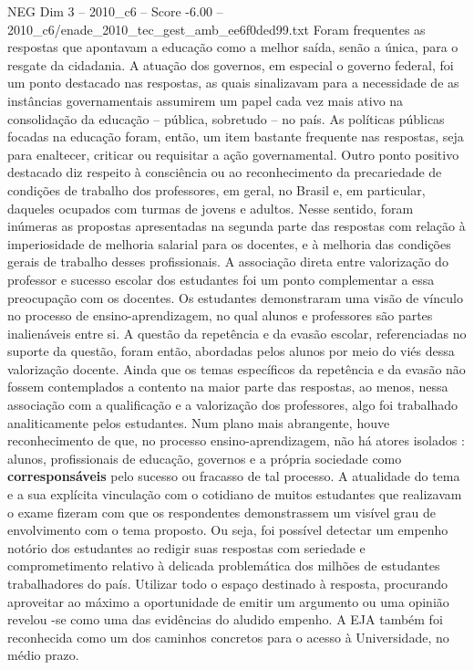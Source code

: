 \begin{textsample}{NEG Dim 3 – 2010\_c6 – Score -6.00 – 2010\_c6/enade\_2010\_tec\_gest\_amb\_ee6f0ded99.txt}
Foram frequentes as respostas que apontavam a educação como a melhor saída, senão a única, para o resgate da cidadania.
A atuação dos governos, em especial o governo federal, foi um ponto destacado nas respostas, as quais sinalizavam para a necessidade de as instâncias governamentais assumirem um papel cada vez mais ativo na consolidação da educação – pública, sobretudo – no país.
As políticas públicas focadas na educação foram, então, um item bastante frequente nas respostas, seja para enaltecer, criticar ou requisitar a ação governamental.
Outro ponto positivo destacado diz respeito à consciência ou ao reconhecimento da precariedade de condições de trabalho dos professores, em geral, no Brasil e, em particular, daqueles ocupados com turmas de jovens e adultos.
Nesse sentido, foram inúmeras as propostas apresentadas na segunda parte das respostas com relação à imperiosidade de melhoria salarial para os docentes, e à melhoria das condições gerais de trabalho desses profissionais.
A associação direta entre valorização do professor e sucesso escolar dos estudantes foi um ponto complementar a essa preocupação com os docentes.
Os estudantes demonstraram uma visão de vínculo no processo de ensino-aprendizagem, no qual alunos e professores são partes inalienáveis entre si.
A questão da repetência e da evasão escolar, referenciadas no suporte da questão, foram então, abordadas pelos alunos por meio do viés dessa valorização docente.
Ainda que os temas específicos da repetência e da evasão não fossem contemplados a contento na maior parte das respostas, ao menos, nessa associação com a qualificação e a valorização dos professores, algo foi trabalhado analiticamente pelos estudantes.
Num plano mais abrangente, houve reconhecimento de que, no processo ensino-aprendizagem, não há atores isolados : alunos, profissionais de educação, governos e a própria sociedade como \textbf{corresponsáveis} pelo sucesso ou fracasso de tal processo.
A atualidade do tema e a sua explícita vinculação com o cotidiano de muitos estudantes que realizavam o exame fizeram com que os respondentes demonstrassem um visível grau de envolvimento com o tema proposto.
Ou seja, foi possível detectar um empenho notório dos estudantes ao redigir suas respostas com seriedade e comprometimento relativo à delicada problemática dos milhões de estudantes trabalhadores do país.
Utilizar todo o espaço destinado à resposta, procurando aproveitar ao máximo a oportunidade de emitir um argumento ou uma opinião revelou -se como uma das evidências do aludido empenho.
A EJA também foi reconhecida como um dos caminhos concretos para o acesso à Universidade, no médio prazo.

\end{textsample}
